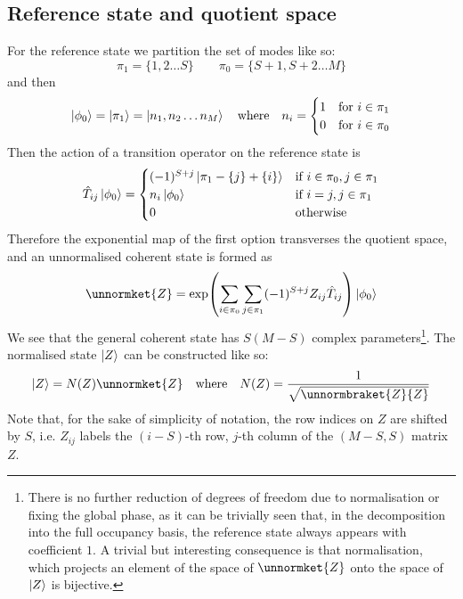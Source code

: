 \documentclass[12pt]{article}
\begin{document}
	
	\subsection{Reference state and quotient space}
	For the reference state we partition the set of modes like so:
	\begin{equation}
	\pi_1=\{1,2\dots S\}\qquad\pi_0=\{S+1, S+2\dots M\}
	\end{equation}
	and then
	\begin{equation}\label{eq:reference state definition}
	\ket{\phi_0}=\ket{\pi_1}=\ket{n_1, n_2\dots n_M}\qq{where}n_i=\begin{cases} 1 & \text{for }i\in\pi_1\\ 0 & \text{for } i\in\pi_0 \end{cases}
	\end{equation}
	Then the action of a transition operator on the reference state is
	\begin{equation}
	\hat{T}_{ij}\ket{\phi_0}=\begin{cases}
		(-1)^{S+j}\ket{\pi_1-\{j\}+\{i\}} & \text{if } i\in\pi_0, j\in\pi_1\\
		n_i\ket{\phi_0} & \text{if } i = j, j\in\pi_1\\
		0 & \text{otherwise}
	\end{cases}
	\end{equation}
	Therefore the exponential map of the first option transverses the quotient space, and an unnormalised coherent state is formed as
	\begin{equation}\label{eq:exponential ket}
	\unnormket{Z}=\exp(\sum_{i\in\pi_0}\sum_{j\in\pi_1}(-1)^{S+j}Z_{ij}\hat{T}_{ij})\ket{\phi_0}
	\end{equation}
	We see that the general coherent state has $S(M-S)$ complex parameters\footnote{There is no further reduction of degrees of freedom due to normalisation or fixing the global phase, as it can be trivially seen that, in the decomposition into the full occupancy basis, the reference state always appears with coefficient $1$. A trivial but interesting consequence is that normalisation, which projects an element of the space of $\unnormket{Z}$ onto the space of $\ket{Z}$ is bijective.}. The normalised state $\ket{Z}$ can be constructed like so:
	\begin{equation}
	\ket{Z} = N(Z)\unnormket{Z}\qq{where}N(Z)=\frac{1}{\sqrt{\unnormbraket{Z}{Z}}}
	\end{equation}
	Note that, for the sake of simplicity of notation, the row indices on $Z$ are shifted by $S$, i.e. $Z_{ij}$ labels the $(i-S)$-th row, $j$-th column of the $(M-S,S)$ matrix $Z$.
	
\end{document}
